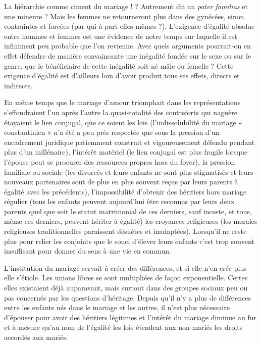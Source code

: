 La hiérarchie comme ciment du mariage ! ? Autrement dit un \emph{pater familias} et une mineure ? Mais les femmes ne retourneront plus dans des gynécées, sinon contraintes et forcées (par qui à part elles-mêmes ?). L'exigence d'égalité absolue entre hommes et femmes est une évidence de notre temps sur laquelle il est infiniment peu probable que l'on revienne. Avec quels arguments pourrait-on en effet défendre de manière convaincante une inégalité fondée sur le sexe ou sur le genre, que le bénéficiaire de cette inégalité soit né mâle ou femelle ? Cette exigence d'égalité est d'ailleurs loin d'avoir produit tous ses effets, directs et indirects. 


 
 En même temps que le mariage d’amour triomphait dans les représentations s’effondraient l’un après l’autre la quasi-totalité des contreforts qui naguère étayaient le lien conjugal, que ce soient les lois (l'indissolubilité du mariage « constantinien » n’a été a peu près respectée que sous la pression d’un encadrement juridique patiemment construit et vigoureusement défendu pendant plus d'un millénaire), l'intérêt matériel (le lien conjugal est plus fragile lorsque l'épouse peut se procurer des ressources propres hors du foyer), la pression familiale ou sociale (les divorcés et leurs enfants ne sont plus stigmatisés et leurs nouveaux partenaires sont de plus en plus souvent reçus par leurs parents à égalité avec les précédents), l’impossibilité d’obtenir des héritiers hors mariage régulier (tous les enfants peuvent aujourd’hui être reconnus par leurs deux parents quel que soit le statut matrimonial de ces derniers, sauf inceste, et tous, même ces derniers, peuvent hériter à égalité) les croyances religieuses (les morales religieuses traditionnelles paraissent désuètes et inadaptées). Lorsqu'il ne reste plus pour relier les conjoints que le souci d’élever leurs enfants c'est trop souvent insuffisant pour donner du sens à une vie en commun.


 
 L’institution du mariage servait à créer des différences, et si elle n’en crée  plus elle s'étiole. Les unions libres se sont multipliées de façon exponentielle. Certes elles existaient déjà auparavant, mais surtout dans des groupes sociaux peu ou pas concernés par les questions d’héritage. Depuis qu'il n'y a plus de différences entre les enfants nés dans le mariage et les autres, il n'est plus nécessaire d'épouser pour avoir des héritiers légitimes et l'intérêt du mariage diminue au fur et à mesure qu'au nom de l'égalité les lois étendent aux non-mariés les droits accordés aux mariés.  
 
